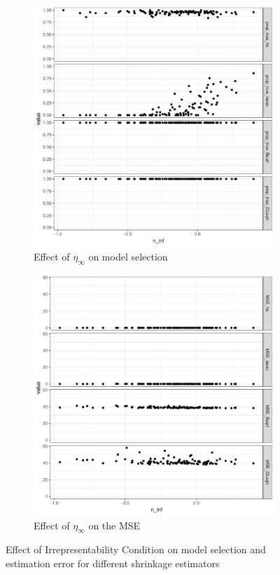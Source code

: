 \documentclass[10pt]{article}
\begin{document}
\begin{figure}[ht!]%
\centering
\begin{subfigure}[t]{0.45\textwidth}
\centering
\includegraphics[width=\columnwidth]{Irrep_model_selec_n100p60_q50_2groups}%
\caption{Effect of $\eta_{\infty}$ on model selection}%
\label{fig:profile:MSP_irrep}%
\end{subfigure}
\begin{subfigure}[t]{0.45\textwidth}
\centering
\includegraphics[width=\columnwidth]{Irrep_MSE_selec_n100p60_q50_2groups}%
\caption{Effect of  $\eta_{\infty}$ on the MSE}%
\label{fig:profile:MSE_irrep}%
\end{subfigure}
\caption{Effect of Irrepresentability Condition on model selection and estimation error for different shrinkage estimators}
\label{fig:profile}
\end{figure}
\end{document}
